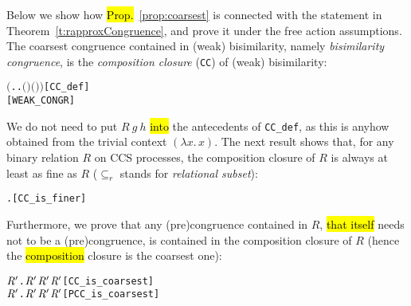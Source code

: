 Below we show how \hl{Prop.}~\ref{prop:coarsest} is connected with
the statement in Theorem~\ref{t:rapproxCongruence}, and prove it under
the free action assumptions.
%
The coarsest congruence
contained in (weak) bisimilarity, namely \emph{bisimilarity
  congruence}, is
the \emph{composition closure} (\texttt{CC}) of (weak) bisimilarity:
\begin{alltt}
     \HOLTokenDefEquality{} \ensuremath{(}\HOLTokenLambda{} . \HOLSymConst{\HOLTokenForall{}}.   \HOLSymConst{\HOLTokenImp{}}  \ensuremath{(} \ensuremath{)} \ensuremath{(} \ensuremath{)}\ensuremath{)}\hfill{[CC_def]}
    \HOLTokenDefEquality{}  \hfill{[WEAK_CONGR]}
\end{alltt}
We do not need to put $R\ g\ h$ \hl{into} the antecedents of
  \texttt{CC\_def}, as this is anyhow obtained from the trivial context $(\lambda x.\,x)$.
The next result shows that, for any binary relation $R$ 
on CCS processes, the composition closure of $R$ is always at least as
fine as $R$ ($\subseteq_r$ stands for \emph{relational subset}):
\begin{alltt}
\HOLTokenTurnstile{} \HOLSymConst{\HOLTokenForall{}}.   \HOLSymConst{\HOLTokenRSubset{}} \hfill{[CC_is_finer]}
\end{alltt}
Furthermore, we prove that any (pre)congruence contained in $R$, \hl{that
itself} needs not to be a (pre)congruence,
is contained in the composition closure of $R$
(hence the \hl{composition} closure is the coarsest one):
\begin{alltt}
\HOLTokenTurnstile{} \HOLSymConst{\HOLTokenForall{}} \ensuremath{\HOLBoundVar{R}\sp{\prime}}.  \ensuremath{\HOLBoundVar{R}\sp{\prime}} \HOLSymConst{\HOLTokenConj{}} \ensuremath{\HOLBoundVar{R}\sp{\prime}} \HOLSymConst{\HOLTokenRSubset{}}  \HOLSymConst{\HOLTokenImp{}} \ensuremath{\HOLBoundVar{R}\sp{\prime}} \HOLSymConst{\HOLTokenRSubset{}}  \hfill{[CC_is_coarsest]}
\HOLTokenTurnstile{} \HOLSymConst{\HOLTokenForall{}} \ensuremath{\HOLBoundVar{R}\sp{\prime}}.  \ensuremath{\HOLBoundVar{R}\sp{\prime}} \HOLSymConst{\HOLTokenConj{}} \ensuremath{\HOLBoundVar{R}\sp{\prime}} \HOLSymConst{\HOLTokenRSubset{}}  \HOLSymConst{\HOLTokenImp{}} \ensuremath{\HOLBoundVar{R}\sp{\prime}} \HOLSymConst{\HOLTokenRSubset{}}  \hfill{[PCC_is_coarsest]}
\end{alltt}

